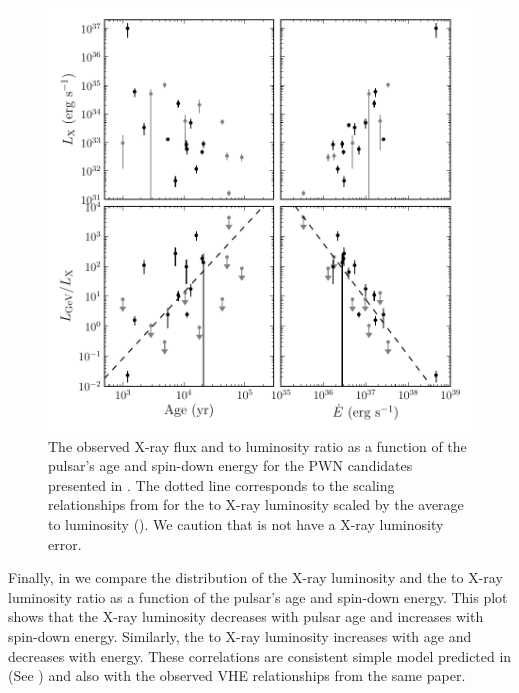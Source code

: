 \begin{figure}[htbp]
  \centering
  \includegraphics{chapters/population_study/figures/pwn_age_edot_vs_l_xray.pdf}
  \caption{The observed X-ray flux and \gev to \tev luminosity ratio as
  a function of the pulsar's age and spin-down energy for the \ac{PWN}
  candidates presented in .
  The dotted line corresponds to the scaling relationships from
  \cite{mattana_2009_evolution-gamma-} for the \tev to X-ray luminosity
  scaled by the average \gev to \tev luminosity (\MeanLuminosityRatio).
  We caution that \threecfiftyeight is not have a X-ray luminosity error.}
\end{figure}

Finally, in  we compare the distribution
of the X-ray luminosity and the \gev to X-ray luminosity ratio as a
function of the pulsar's age and spin-down energy.  This plot shows
that the X-ray luminosity decreases with pulsar age and increases with
spin-down energy. Similarly, the \gev to X-ray luminosity increases
with age and decreases with energy.  These correlations are consistent
simple model predicted in \cite{mattana_2009_evolution-gamma-} (See
) and also with the observed \ac{VHE} relationships
from the same paper.
